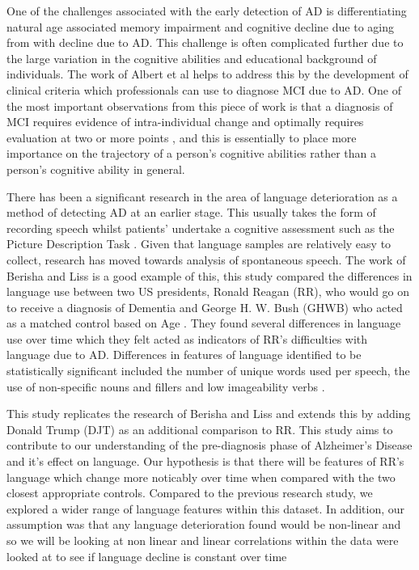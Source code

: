 \documentclass[12pt]{article}
\begin{document}
\par
One of the challenges associated with the early detection of AD is differentiating natural age associated memory impairment and cognitive decline due to aging from with decline due to AD. This challenge is often complicated further due to the large variation in the cognitive abilities and educational background of individuals. The work of Albert et al helps to address this by the development of clinical criteria which professionals can use to diagnose MCI due to AD. One of the most important observations from this piece of work is that a diagnosis of MCI requires evidence of intra-individual change and optimally requires evaluation at two or more points \cite{Albert2011}, and this is essentially to place more importance on the trajectory of a person's cognitive abilities rather than a person's cognitive ability in general. 
\par 
There has been a significant research in the area of language deterioration as a method of detecting AD at an earlier stage. This usually takes the form of recording speech whilst patients' undertake a cognitive assessment such as the Picture Description Task \cite{Orimaye2014,Fraser2015}. Given that language samples are relatively easy to collect, research has moved towards analysis of spontaneous speech. The work of Berisha and Liss is a good example of this, this study compared the differences in language use between two US presidents, Ronald Reagan (RR), who would go on to receive a diagnosis of Dementia and George H. W. Bush (GHWB) who acted as a matched control based on Age \cite{Berisha2015}. They found several differences in language use over time which they felt acted as indicators of RR's difficulties with language due to AD. Differences in features of language identified to be statistically significant included the number of unique words used per speech, the use of non-specific nouns and fillers and low imageability verbs \cite{Berisha2015}. 
\par   
This study replicates the research of Berisha and Liss and extends this by adding Donald Trump (DJT) as an additional comparison to RR. This study aims to contribute to our understanding of the pre-diagnosis phase of Alzheimer's Disease and it's effect on language. Our hypothesis is that there will be features of RR's language which change more noticably over time when compared with the two closest appropriate controls. Compared to the previous research study, we explored a wider range of language features within this dataset. In addition, our assumption was that any language deterioration found would be non-linear and so we will be looking at non linear and linear correlations within the data were looked at to see if language decline is constant over time
\end{document}
